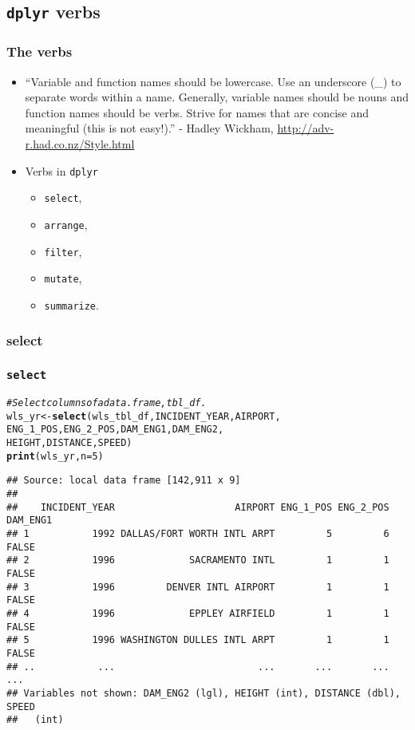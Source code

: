 \documentclass{beamer}\usepackage[]{graphicx}\usepackage[]{color}
\makeatletter
\newcommand{\hlnum}[1]{\textcolor[rgb]{0.686,0.059,0.569}{#1}}%
\newcommand{\hlcom}[1]{\textcolor[rgb]{0.678,0.584,0.686}{\textit{#1}}}%
\newcommand{\hlstd}[1]{\textcolor[rgb]{0.345,0.345,0.345}{#1}}%
\newcommand{\hlkwb}[1]{\textcolor[rgb]{0.69,0.353,0.396}{#1}}%
\newcommand{\hlkwc}[1]{\textcolor[rgb]{0.333,0.667,0.333}{#1}}%
\newcommand{\hlkwd}[1]{\textcolor[rgb]{0.737,0.353,0.396}{\textbf{#1}}}%
\newenvironment{kframe}{%
 \def\at@end@of@kframe{}%
 \ifinner\ifhmode%
  \def\at@end@of@kframe{\end{minipage}}%
  \begin{minipage}{\columnwidth}%
 \fi\fi%
 \def\FrameCommand##1{\hskip\@totalleftmargin \hskip-\fboxsep
 \colorbox{shadecolor}{##1}\hskip-\fboxsep
     \hskip-\linewidth \hskip-\@totalleftmargin \hskip\columnwidth}%
 \MakeFramed {\advance\hsize-\width
   \@totalleftmargin\z@ \linewidth\hsize
   \@setminipage}}%
 {\par\unskip\endMakeFramed%
 \at@end@of@kframe}
\newenvironment{knitrout}{}{} %
\makeatother
\begin{document}
\subsection{{\tt dplyr} verbs}%
\begin{frame}[fragile]
  \frametitle{The verbs}
  \begin{itemize}
    \item ``Variable and function names should be lowercase. Use an underscore
      (\_) to separate words within a name. Generally, variable names should be
      nouns and function names should be verbs. Strive for names that are
      concise and meaningful (this is not easy!).'' - Hadley Wickham,
      \url{http://adv-r.had.co.nz/Style.html}

    \item Verbs in {\tt dplyr} 
      \begin{itemize}
        \item {\tt select},
        \item {\tt arrange},
        \item {\tt filter},
        \item {\tt mutate}, 
        \item {\tt summarize}.
      \end{itemize}
  \end{itemize}
\end{frame} 

\subsubsection{select}%

\begin{frame}[fragile]
  \frametitle{{\tt select}}
\begin{knitrout}\footnotesize
{}\color{fgcolor}\begin{kframe}
\begin{alltt}
\hlcom{# Select columns of a data.frame, tbl_df.}
\hlstd{wls_yr} \hlkwb{<-} \hlkwd{select}\hlstd{(wls_tbl_df, INCIDENT_YEAR, AIRPORT,}
                 \hlstd{ENG_1_POS, ENG_2_POS, DAM_ENG1, DAM_ENG2,}
                 \hlstd{HEIGHT, DISTANCE, SPEED)}
\hlkwd{print}\hlstd{(wls_yr,} \hlkwc{n} \hlstd{=} \hlnum{5}\hlstd{)}
\end{alltt}
\begin{verbatim}
## Source: local data frame [142,911 x 9]
## 
##    INCIDENT_YEAR                     AIRPORT ENG_1_POS ENG_2_POS DAM_ENG1
## 1           1992 DALLAS/FORT WORTH INTL ARPT         5         6    FALSE
## 2           1996             SACRAMENTO INTL         1         1    FALSE
## 3           1996         DENVER INTL AIRPORT         1         1    FALSE
## 4           1996             EPPLEY AIRFIELD         1         1    FALSE
## 5           1996 WASHINGTON DULLES INTL ARPT         1         1    FALSE
## ..           ...                         ...       ...       ...      ...
## Variables not shown: DAM_ENG2 (lgl), HEIGHT (int), DISTANCE (dbl), SPEED
##   (int)
\end{verbatim}
\end{kframe}
\end{knitrout}
\end{frame} 
\end{document}
